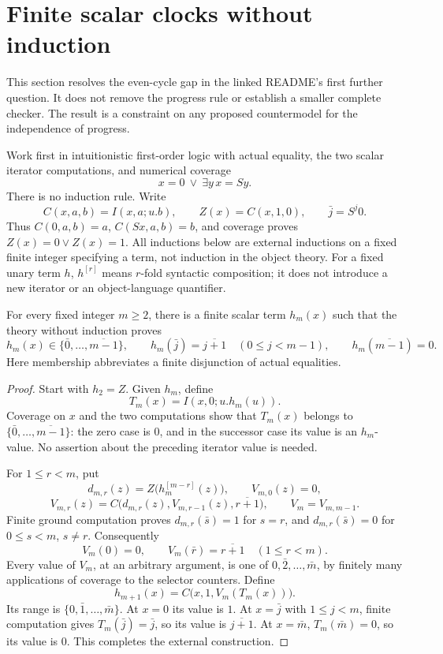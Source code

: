 \section{Finite scalar clocks without induction}
\label{sec:finite-clocks}

This section resolves the even-cycle gap in the linked README's first
further question. It does not remove the progress rule or establish a smaller
complete checker. The result is a constraint on any proposed countermodel
for the independence of progress.

Work first in intuitionistic first-order logic with actual equality, the
two scalar iterator computations, and numerical coverage
\[
 x=0\ \lor\ \exists y\,x=Sy.
\]
There is no induction rule. Write
\[
 C(x,a,b)=I(x,a;u.b),\qquad Z(x)=C(x,1,0),\qquad
 \bar j=S^j0.
\]
Thus $C(0,a,b)=a$, $C(Sx,a,b)=b$, and coverage proves
$Z(x)=0\lor Z(x)=1$. All inductions below are external inductions on a
fixed finite integer specifying a term, not induction in the object theory.
For a fixed unary term $h$, $h^{[r]}$ means $r$-fold syntactic composition;
it does not introduce a new iterator or an object-language quantifier.

\begin{lemma}
For every fixed integer $m\geq2$, there is a finite scalar term $h_m(x)$
such that the theory without induction proves
\[
 h_m(x)\in\{\bar0,\ldots,\overline{m-1}\},\qquad
 h_m(\bar j)=\overline{j+1}\quad(0\leq j<m-1),\qquad
 h_m(\overline{m-1})=0.
\]
Here membership abbreviates a finite disjunction of actual equalities.
\end{lemma}
\begin{proof}
Start with $h_2=Z$. Given $h_m$, define
\[
 T_m(x)=I(x,0;u.h_m(u)).
\]
Coverage on $x$ and the two computations show that $T_m(x)$ belongs to
$\{\bar0,\ldots,\overline{m-1}\}$: the zero case is $0$, and in the
successor case its value is an $h_m$-value. No assertion about the preceding
iterator value is needed.

For $1\leq r<m$, put
\[
 d_{m,r}(z)=Z\bigl(h_m^{[m-r]}(z)\bigr),\qquad
 V_{m,0}(z)=0,
\]
\[
 V_{m,r}(z)=C\bigl(d_{m,r}(z),V_{m,r-1}(z),\overline{r+1}\bigr),
 \qquad V_m=V_{m,m-1}.
\]
Finite ground computation proves
$d_{m,r}(\bar s)=1$ for $s=r$, and $d_{m,r}(\bar s)=0$ for
$0\leq s<m$, $s\ne r$. Consequently
\[
 V_m(0)=0,\qquad V_m(\bar r)=\overline{r+1}\quad(1\leq r<m).
\]
Every value of $V_m$, at an arbitrary argument, is one of
$0,\bar2,\ldots,\bar m$, by finitely many applications of coverage to
the selector counters. Define
\[
 \boxed{\quad h_{m+1}(x)=C\bigl(x,1,V_m(T_m(x))\bigr).\quad}
\]
Its range is $\{0,\bar1,\ldots,\bar m\}$. At $x=0$ its value is $1$.
At $x=\bar j$ with $1\leq j<m$, finite computation gives
$T_m(\bar j)=\bar j$, so its value is $\overline{j+1}$. At $x=\bar m$,
$T_m(\bar m)=0$, so its value is $0$. This completes the external
construction.
\end{proof}

